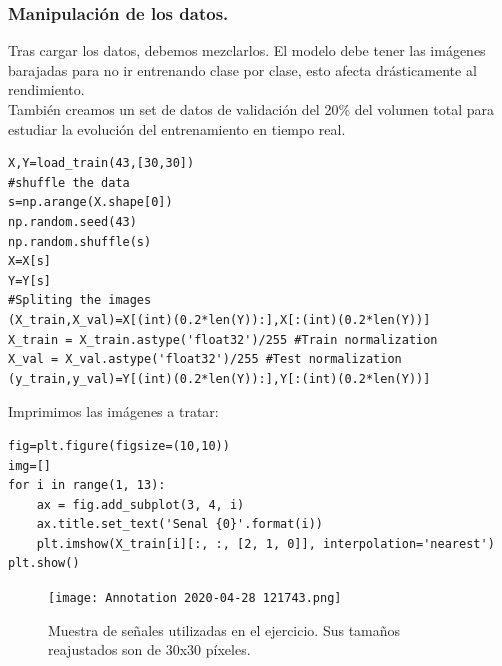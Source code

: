 \documentclass[a4paper,11pt]{article}
\begin{document}
\subsubsection{Manipulación de los datos.}
Tras cargar los datos, debemos mezclarlos. El modelo debe tener las imágenes barajadas para no ir entrenando clase por clase, esto afecta drásticamente al rendimiento. \\

\noindent
También creamos un set de datos de validación del 20\% del volumen total para estudiar la evolución del entrenamiento en tiempo real.
\begin{lstlisting}
X,Y=load_train(43,[30,30])
#shuffle the data
s=np.arange(X.shape[0])
np.random.seed(43)
np.random.shuffle(s)
X=X[s]
Y=Y[s]
#Spliting the images 
(X_train,X_val)=X[(int)(0.2*len(Y)):],X[:(int)(0.2*len(Y))]
X_train = X_train.astype('float32')/255 #Train normalization 
X_val = X_val.astype('float32')/255 #Test normalization
(y_train,y_val)=Y[(int)(0.2*len(Y)):],Y[:(int)(0.2*len(Y))]
\end{lstlisting}
Imprimimos las imágenes a tratar:
\begin{lstlisting}
fig=plt.figure(figsize=(10,10))
img=[]
for i in range(1, 13):
    ax = fig.add_subplot(3, 4, i)
    ax.title.set_text('Senal {0}'.format(i))
    plt.imshow(X_train[i][:, :, [2, 1, 0]], interpolation='nearest')
plt.show()
\end{lstlisting}
\begin{figure}[H]
\centering
\texttt{[image: Annotation 2020-04-28 121743.png]}
\caption{Muestra de señales utilizadas en el ejercicio. Sus tamaños reajustados son de 30x30 píxeles.}
\end{figure}
\end{document}
